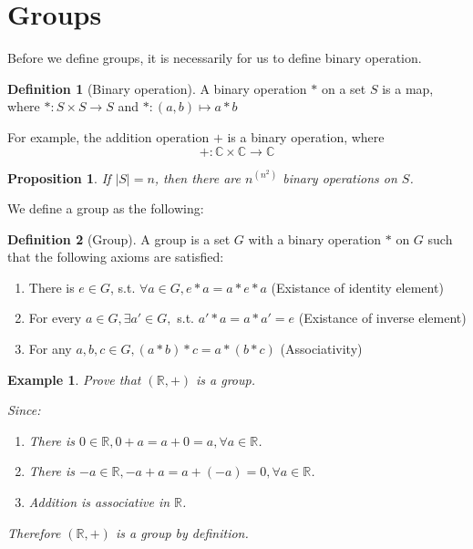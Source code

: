 \documentclass{article}
\theoremstyle{MyNonumberplain}
\theoremstyle{break}
\newcommand{\R}{\mathbb{R}}
\newcommand{\C}{\mathbb{C}}
\theoremstyle{break}
\newtheorem{proposition}{Proposition}[section]
\newtheorem{example}{Example}[section]
\theoremstyle{break}
\theoremstyle{definition}
\theoremstyle{break}
\newtheorem{definition}{Definition}[section]
\begin{document}
\newpage

\setcounter{section}{3}

\section{Groups}

Before we define groups, it is necessarily for us to define binary operation.

\begin{defbox}
    \begin{definition}[Binary operation]
        A binary operation $\ast$ on a set $S$ is a map, where $\ast : S \times S \rightarrow S$ and $\ast : (a, b) \mapsto a \ast b$
    \end{definition}
\end{defbox}

For example, the addition operation $+$ is a binary operation, where $$+:\C\times\C\to\C$$

\begin{thmbox}
    \begin{proposition}
        If $|S|=n$, then there are $n^{(n^2)}$ binary operations on $S$.
    \end{proposition}
\end{thmbox}


We define a group as the following:

\begin{defbox}
    \begin{definition}[Group]
        A group is a set $G$ with a binary operation $*$ on $G$ such that the following axioms are satisfied:\bigskip
        \begin{enumerate}
            \item There is $e\in G$, s.t. $\forall a\in G, e*a=a*e*a$ (Existance of identity element)\bigskip
            \item For every $a\in G,\exists a'\in G,$ s.t. $a'*a=a*a'=e$ (Existance of inverse element)\bigskip
            \item For any $a,b,c\in G, (a*b)*c=a*(b*c)$ (Associativity)
        \end{enumerate}
    \end{definition}
\end{defbox}

\begin{expbox}
    \begin{example}
        Prove that $(\R,+)$ is a group.

\begin{ansbox}
    Since: \bigskip
    \begin{enumerate}       
        \item There is $0\in\R,0+a=a+0=a,\forall a\in\R$.\bigskip
        \item There is $-a\in\R,-a+a=a+(-a)=0,\forall a\in\R$.\bigskip
        \item Addition is associative in $\R$.\bigskip
    \end{enumerate}
    
    Therefore $(\R,+)$ is a group by definition.
\end{ansbox}
    \end{example}
\end{expbox}
\end{document}
